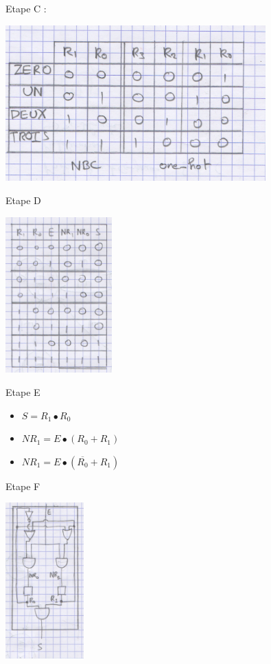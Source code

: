 Etape C :
\begin{center}
  \includegraphics[height=6cm]{cours1/pics/truthtable.png}
\end{center}

Etape D
\begin{center}
  \includegraphics[height=6cm]{cours1/pics/equationtable.png}
\end{center}

Etape E
\begin{itemize}
  \item \(S=R_1 \bullet R_0\)
  \item \(NR_1 = E \bullet {(R_0 + R_1)}\)
  \item \(NR_1 = E \bullet {(\overline{R_0} + R_1)}\)
\end{itemize}

Etape F
\begin{center}
  \includegraphics[height=6cm]{cours1/pics/circuit.png}
\end{center}
